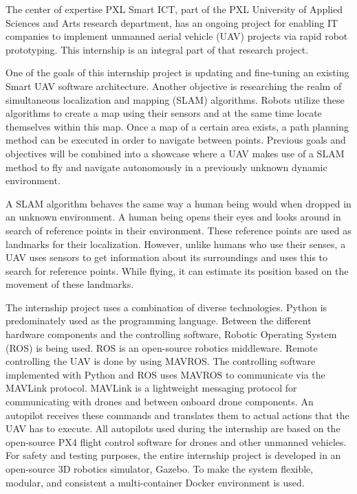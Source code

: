 The center of expertise PXL Smart ICT, part of the PXL University of Applied Sciences and Arts research department, has an ongoing project for enabling IT companies to implement unmanned aerial vehicle (UAV) projects via rapid robot prototyping. This internship is an integral part of that research project.

One of the goals of this internship project is updating and fine\hyp{}tuning an existing Smart UAV software architecture. Another objective is researching the realm of simultaneous localization and mapping (SLAM) algorithms. Robots utilize these algorithms to create a map using their sensors and at the same time locate themselves within this map. Once a map of a certain area exists, a path planning method can be executed in order to navigate between points. Previous goals and objectives will be combined into a showcase where a UAV makes use of a SLAM method to fly and navigate autonomously in a previously unknown dynamic environment.

A SLAM algorithm behaves the same way a human being would when dropped in an unknown environment. A human being opens their eyes and looks around in search of reference points in their environment. These reference points are used as landmarks for their localization. However, unlike humans who use their senses, a UAV uses sensors to get information about its surroundings and uses this to search for reference points. While flying, it can estimate its position based on the movement of these landmarks.

The internship project uses a combination of diverse technologies. Python is predominately used as the programming language. Between the different hardware components and the controlling software, Robotic Operating System (ROS) is being used. ROS is an open\hyp{}source robotics middleware. Remote controlling the UAV is done by using MAVROS. The controlling software implemented with Python and ROS uses MAVROS to communicate via the MAVLink protocol. MAVLink is a lightweight messaging protocol for communicating with drones and between onboard drone components. An autopilot receives these commands and translates them to actual actions that the UAV has to execute. All autopilots used during the internship are based on the open\hyp{}source PX4 flight control software for drones and other unmanned vehicles. For safety and testing purposes, the entire internship project is developed in an open\hyp{}source 3D robotics simulator, Gazebo. To make the system flexible, modular, and consistent a multi\hyp{}container Docker environment is used.

